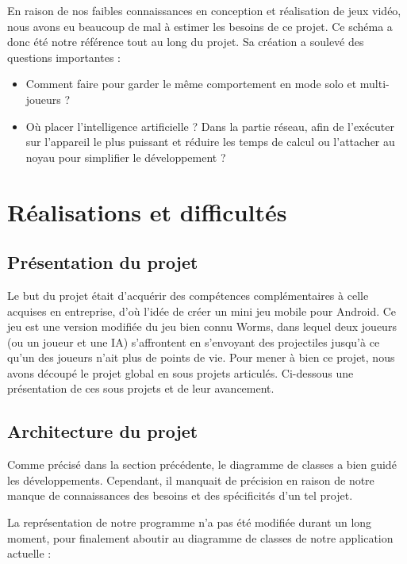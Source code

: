 \documentclass{report}
\begin{document}
En raison de nos faibles connaissances en conception et réalisation de jeux vidéo, nous avons eu beaucoup de mal à estimer les besoins de ce projet. Ce schéma a donc été notre référence tout au long du projet. Sa création a soulevé des questions importantes :

\begin{itemize}
\item Comment faire pour garder le même comportement en mode solo et multi-joueurs ?
\item Où placer l’intelligence artificielle ? Dans la partie réseau, afin de l’exécuter sur l’appareil le plus puissant et réduire les temps de calcul ou l’attacher au noyau pour simplifier le développement ?
\end{itemize}

\section{Réalisations et difficultés}

\subsection{Présentation du projet}

Le but du projet était d'acquérir des compétences complémentaires à celle acquises en entreprise, d’où l’idée de créer un mini jeu mobile pour Android. Ce jeu est une version modifiée du jeu bien connu Worms, dans lequel deux joueurs (ou un joueur et une IA) s’affrontent en s’envoyant des projectiles jusqu’à ce qu’un des joueurs n’ait plus de points de vie.
Pour mener à bien ce projet, nous avons découpé le projet global en sous projets articulés. Ci-dessous une présentation de ces sous projets et de leur avancement.

\subsection{Architecture du projet}

Comme précisé dans la section précédente, le diagramme de classes a bien guidé les développements. Cependant, il manquait de précision en raison de notre manque de connaissances des besoins et des spécificités d’un tel projet.

La représentation de notre programme n’a pas été modifiée durant un long moment, pour finalement aboutir au diagramme de classes de notre application actuelle :
\end{document}

